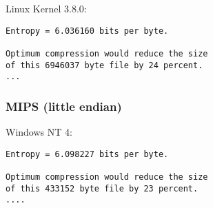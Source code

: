 Linux Kernel 3.8.0:

\begin{lstlisting}
Entropy = 6.036160 bits per byte.

Optimum compression would reduce the size
of this 6946037 byte file by 24 percent.
...
\end{lstlisting}

\subsubsection{MIPS (little endian)}

   Windows NT 4:

\begin{lstlisting}
Entropy = 6.098227 bits per byte.

Optimum compression would reduce the size
of this 433152 byte file by 23 percent.
....
\end{lstlisting}

